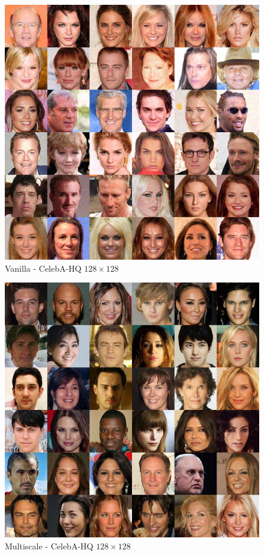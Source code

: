 \begin{figure}
    \centering
    \includegraphics[width=\textwidth]{Chapter2/samples/multiscale/vanilla.png}
    \caption{Vanilla - CelebA-HQ $128\times 128$}
    \label{ch2:fig:Vanilla}
\end{figure}

\begin{figure}
    \centering
    \includegraphics[width=\textwidth]{Chapter2/samples/multiscale/multiscale.png}
    \caption{Multiscale - CelebA-HQ $128\times 128$}
    \label{ch2:fig:Multiscale}
\end{figure}

